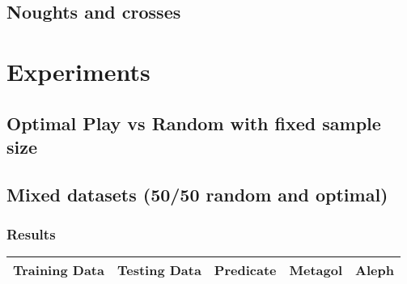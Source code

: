 \documentclass[a4paper,12pt]{report}
\begin{document}
\section{Noughts and crosses}
\chapter{Experiments}
\section{Optimal Play vs Random with fixed sample size}
\section{Mixed datasets (50/50 random and optimal)}
\subsection{Results}
\begin{center}
\begin{tabular}{| l | l | l | l | l |}
\hline
Training Data & Testing Data & Predicate & Metagol & Aleph \\ \hline
\end{tabular}
\end{center}
\end{document}
